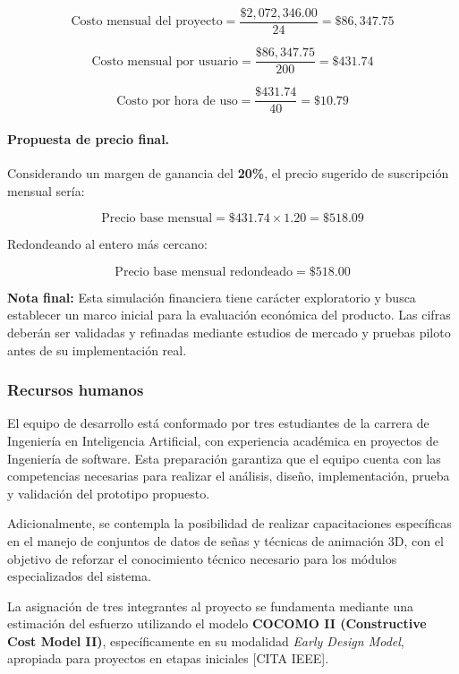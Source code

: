 \[
\text{Costo mensual del proyecto} = \frac{\$2,072,346.00}{24} = \$86,347.75
\]

\[
\text{Costo mensual por usuario} = \frac{\$86,347.75}{200} = \$431.74
\]

\[
\text{Costo por hora de uso} = \frac{\$431.74}{40} = \$10.79
\]


\paragraph{\textbf{Propuesta de precio final.}}
Considerando un margen de ganancia del \textbf{20\%}, el precio sugerido de suscripción mensual sería:

\[
\text{Precio base mensual} = \$431.74 \times 1.20 = \$518.09
\]

Redondeando al entero más cercano:

\[
\text{Precio base mensual redondeado} = \$518.00
\]

\begin{flushleft}
	\textbf{Nota final:} Esta simulación financiera tiene carácter exploratorio y busca establecer un marco inicial para la evaluación económica del producto. Las cifras deberán ser validadas y refinadas mediante estudios de mercado y pruebas piloto antes de su implementación real.
\end{flushleft}



\subsubsection{Recursos humanos}
El equipo de desarrollo está conformado por tres estudiantes de la carrera de Ingeniería en Inteligencia Artificial, con experiencia académica en proyectos de Ingeniería de software. Esta preparación garantiza que el equipo cuenta con las competencias necesarias para realizar el análisis, diseño, implementación, prueba y validación del prototipo propuesto.

Adicionalmente, se contempla la posibilidad de realizar capacitaciones específicas en el manejo de conjuntos de datos de señas y técnicas de animación 3D, con el objetivo de reforzar el conocimiento técnico necesario para los módulos especializados del sistema.

La asignación de tres integrantes al proyecto se fundamenta mediante una estimación del esfuerzo utilizando el modelo \textbf{COCOMO II (Constructive Cost Model II)}, específicamente en su modalidad \textit{Early Design Model}, apropiada para proyectos en etapas iniciales [CITA IEEE].

